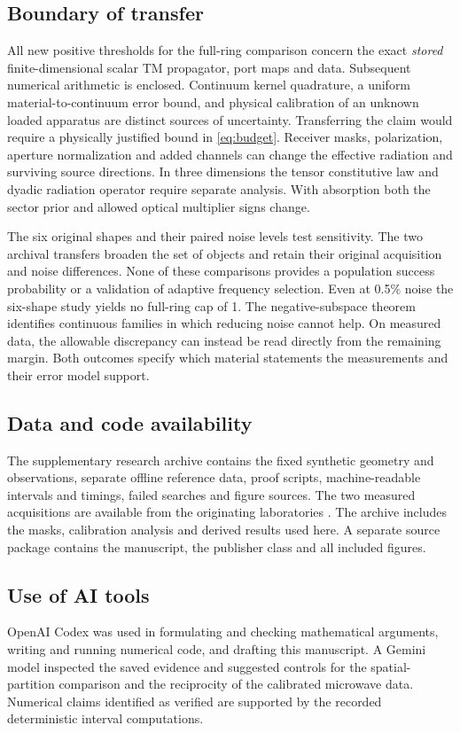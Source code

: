 \documentclass[anonymous,12pt]{iopjournal}
\theoremstyle{remark}\newtheorem{remark}[theorem]{Remark}
\numberwithin{equation}{section}
\begin{document}
\subsection{Boundary of transfer}
All new positive thresholds for the full-ring comparison concern the exact \emph{stored} finite-dimensional scalar TM propagator, port maps and data. Subsequent numerical arithmetic is enclosed. Continuum kernel quadrature, a uniform material-to-continuum error bound, and physical calibration of an unknown loaded apparatus are distinct sources of uncertainty. Transferring the claim would require a physically justified bound in \eqref{eq:budget}. Receiver masks, polarization, aperture normalization and added channels can change the effective radiation and surviving source directions. In three dimensions the tensor constitutive law and dyadic radiation operator require separate analysis. With absorption both the sector prior and allowed optical multiplier signs change.

The six original shapes and their paired noise levels test sensitivity. The two archival transfers broaden the set of objects and retain their original acquisition and noise differences. None of these comparisons provides a population success probability or a validation of adaptive frequency selection. Even at 0.5\% noise the six-shape study yields no full-ring cap of 1. The negative-subspace theorem identifies continuous families in which reducing noise cannot help. On measured data, the allowable discrepancy can instead be read directly from the remaining margin. Both outcomes specify which material statements the measurements and their error model support.

\subsection*{Data and code availability}
The supplementary research archive contains the fixed synthetic geometry and observations, separate offline reference data, proof scripts, machine-readable intervals and timings, failed searches and figure sources. The two measured acquisitions are available from the originating laboratories \cite{fresnel,manitoba}. The archive includes the masks, calibration analysis and derived results used here. A separate source package contains the manuscript, the publisher class and all included figures.

\subsection*{Use of AI tools}
OpenAI Codex was used in formulating and checking mathematical arguments, writing and running numerical code, and drafting this manuscript. A Gemini model inspected the saved evidence and suggested controls for the spatial-partition comparison and the reciprocity of the calibrated microwave data. Numerical claims identified as verified are supported by the recorded deterministic interval computations.
\end{document}
